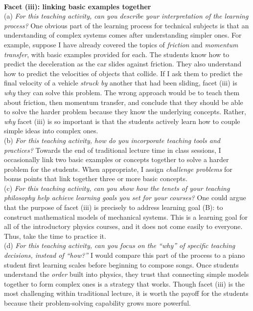 \documentclass[../../../main.tex]{subfiles}
\begin{document}
\\
\vspace{0.25cm}
\textbf{Facet (iii): linking basic examples together}
\\
\vspace{0.25cm}
(a) \textit{For this teaching activity, can you describe your interpretation of the learning process?} One obvious part of the learning process for technical subjects is that an understanding of complex systems comes after understanding simpler ones.  For example, suppose I have already covered the topics of \textit{friction} and \textit{momentum transfer}, with basic examples provided for each.  The students know how to predict the deceleration as the car slides against friction.  They also understand how to predict the velocities of objects that collide.  If I ask them to predict the final velocity of a vehicle \textit{struck by} another that had been sliding, facet (iii) is \textit{why} they can solve this problem.  The wrong approach would be to teach them about friction, then momentum transfer, and conclude that they should be able to solve the harder problem because they know the underlying concepts.  Rather, \textit{why} facet (iii) is so important is that the students actively learn how to couple simple ideas into complex ones.
\\
\vspace{0.25cm}
(b) \textit{For this teaching activity, how do you incorporate teaching tools and practices?} Towards the end of traditional lecture time in class sessions, I occasionally link two basic examples or concepts together to solve a harder problem for the students.  When appropriate, I assign \textit{challenge problems} for bonus points that link together three or more basic concepts.
\\
\vspace{0.25cm}
(c) \textit{For this teaching activity, can you show how the tenets of your teaching philosophy help achieve learning goals you set for your courses?}  One could argue that the purpose of facet (iii) is precisely to address learning goal (B): to construct mathematical models of mechanical systems.  This is a learning goal for all of the introductory physics courses, and it does not come easily to everyone.  Thus, take the time to practice it.
\\
\vspace{0.25cm}
(d) \textit{For this teaching activity, can you focus on the ``why'' of specific teaching decisions, instead of ``how?''}  I would compare this part of the process to a piano student first learning scales before beginning to compose songs.  Once students understand the \textit{order} built into physics, they trust that connecting simple models together to form complex ones is a strategy that works.  Though facet (iii) is the most challenging within traditional lecture, it is worth the payoff for the students because their problem-solving capability grows more powerful.
\end{document}
